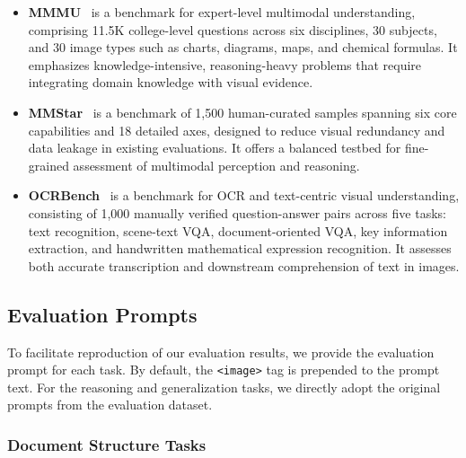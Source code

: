 \begin{itemize}[
  leftmargin=1.0em,
  labelsep=0.5em
]
    \item \textbf{MMMU}~\cite{yue2024mmmu} is a benchmark for expert-level multimodal understanding, comprising 11.5K college-level questions across six disciplines, 30 subjects, and 30 image types such as charts, diagrams, maps, and chemical formulas. It emphasizes knowledge-intensive, reasoning-heavy problems that require integrating domain knowledge with visual evidence.

    \item \textbf{MMStar}~\cite{chen2024we} is a benchmark of 1,500 human-curated samples spanning six core capabilities and 18 detailed axes, designed to reduce visual redundancy and data leakage in existing evaluations. It offers a balanced testbed for fine-grained assessment of multimodal perception and reasoning.

    \item \textbf{OCRBench}~\cite{liu2024ocrbench} is a benchmark for OCR and text-centric visual understanding, consisting of 1,000 manually verified question-answer pairs across five tasks: text recognition, scene-text VQA, document-oriented VQA, key information extraction, and handwritten mathematical expression recognition. It assesses both accurate transcription and downstream comprehension of text in images.

\end{itemize}

\subsection{Evaluation Prompts}

To facilitate reproduction of our evaluation results, we provide the evaluation prompt for each task. By default, the \texttt{<image>} tag is prepended to the prompt text. For the reasoning and generalization tasks, we directly adopt the original prompts from the evaluation dataset.

\subsubsection*{Document Structure Tasks}


